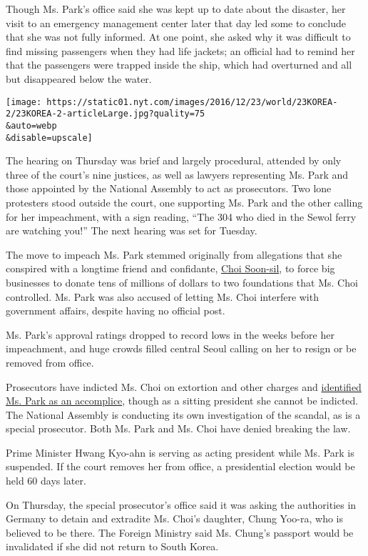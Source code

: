 Though Ms. Park's office said she was kept up to date about the
disaster, her visit to an emergency management center later that day led
some to conclude that she was not fully informed. At one point, she
asked why it was difficult to find missing passengers when they had life
jackets; an official had to remind her that the passengers were trapped
inside the ship, which had overturned and all but disappeared below the
water.

\texttt{[image: https://static01.nyt.com/images/2016/12/23/world/23KOREA-2/23KOREA-2-articleLarge.jpg?quality=75\\\&auto=webp\\\&disable=upscale]}

The hearing on Thursday was brief and largely procedural, attended by
only three of the court's nine justices, as well as lawyers representing
Ms. Park and those appointed by the National Assembly to act as
prosecutors. Two lone protesters stood outside the court, one supporting
Ms. Park and the other calling for her impeachment, with a sign reading,
``The 304 who died in the Sewol ferry are watching you!'' The next
hearing was set for Tuesday.

The move to impeach Ms. Park stemmed originally from allegations that
she conspired with a longtime friend and confidante,
\href{http://www.nytimes.com/2016/11/01/world/asia/south-korea-park-geun-hye-choi-soon-sil.html}{Choi
Soon-sil}, to force big businesses to donate tens of millions of dollars
to two foundations that Ms. Choi controlled. Ms. Park was also accused
of letting Ms. Choi interfere with government affairs, despite having no
official post.

Ms. Park's approval ratings dropped to record lows in the weeks before
her impeachment, and huge crowds filled central Seoul calling on her to
resign or be removed from office.

Prosecutors have indicted Ms. Choi on extortion and other charges and
\href{http://www.nytimes.com/2016/11/20/world/asia/park-geun-hye-south-korea-extortion-accomplice-prosecutors.html}{identified
Ms. Park as an accomplice}, though as a sitting president she cannot be
indicted. The National Assembly is conducting its own investigation of
the scandal, as is a special prosecutor. Both Ms. Park and Ms. Choi have
denied breaking the law.

Prime Minister Hwang Kyo-ahn is serving as acting president while Ms.
Park is suspended. If the court removes her from office, a presidential
election would be held 60 days later.

On Thursday, the special prosecutor's office said it was asking the
authorities in Germany to detain and extradite Ms. Choi's daughter,
Chung Yoo-ra, who is believed to be there. The Foreign Ministry said Ms.
Chung's passport would be invalidated if she did not return to South
Korea.

